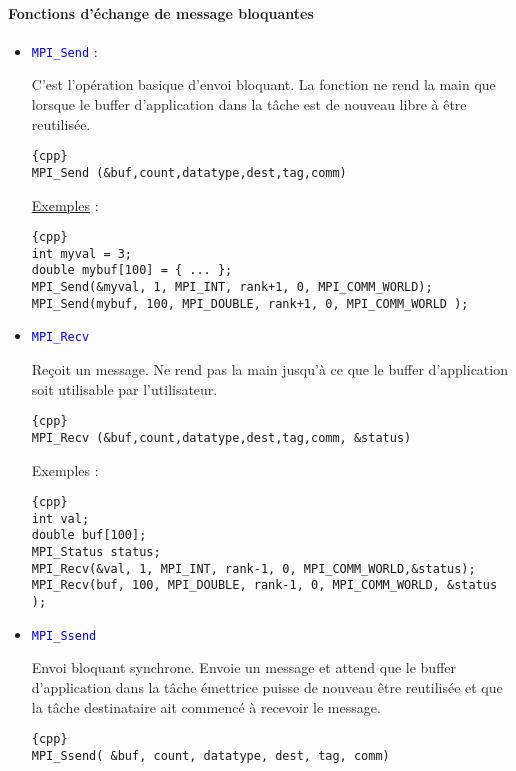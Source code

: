 \documentclass[11pt,a4paper]{article}
\begin{document}
\paragraph{Fonctions d'échange de message bloquantes}

\begin{itemize}
\item \textcolor{blue}{\texttt{MPI\_Send}} :

C'est l'opération basique d'envoi bloquant. La fonction ne rend la main que lorsque le buffer d'application dans la tâche est de nouveau libre
à être reutilisée. 

\begin{lstlisting}{cpp}
MPI_Send (&buf,count,datatype,dest,tag,comm) 
\end{lstlisting}

\underline{Exemples} :
\begin{lstlisting}{cpp}
int myval = 3;
double mybuf[100] = { ... };
MPI_Send(&myval, 1, MPI_INT, rank+1, 0, MPI_COMM_WORLD);
MPI_Send(mybuf, 100, MPI_DOUBLE, rank+1, 0, MPI_COMM_WORLD );
\end{lstlisting}

\item \textcolor{blue}{\texttt{MPI\_Recv}}

Reçoit un message. Ne rend pas la main jusqu'à ce que le buffer d'application  soit utilisable par l'utilisateur.

\begin{lstlisting}{cpp}
MPI_Recv (&buf,count,datatype,dest,tag,comm, &status) 
\end{lstlisting}


Exemples :
\begin{lstlisting}{cpp}
int val;
double buf[100];
MPI_Status status;
MPI_Recv(&val, 1, MPI_INT, rank-1, 0, MPI_COMM_WORLD,&status);
MPI_Recv(buf, 100, MPI_DOUBLE, rank-1, 0, MPI_COMM_WORLD, &status );
\end{lstlisting}

\item \textcolor{blue}{\texttt{MPI\_Ssend}}

Envoi bloquant synchrone. Envoie un message et attend que le buffer d'application dans la tâche émettrice
puisse de nouveau être reutilisée et que la tâche destinataire ait commencé à recevoir le message.

\begin{lstlisting}{cpp}
MPI_Ssend( &buf, count, datatype, dest, tag, comm)
\end{lstlisting}


\end{itemize}
\end{document}
